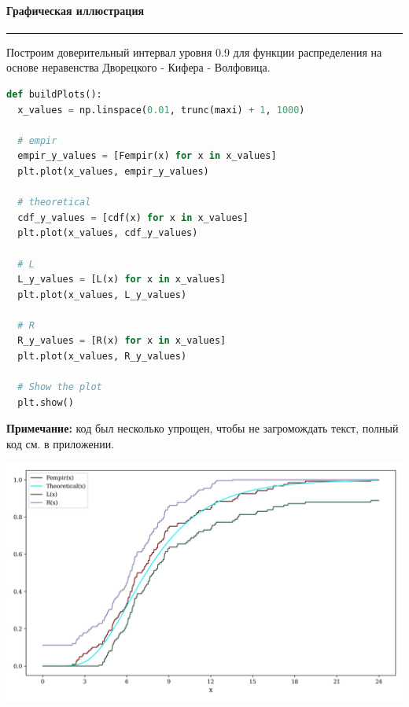 \documentclass[a4paper, 14pt]{extarticle}
\begin{document}
\paragraph{Графическая иллюстрация}\vspace{-20pt}\rule{\linewidth}{0.1mm}

Построим доверительный интервал уровня 0.9 для функции распределения на 
основе неравенства Дворецкого - Кифера - Волфовица.\\

\begin{center}
  \begin{lstlisting}[language=Python]
def buildPlots():
  x_values = np.linspace(0.01, trunc(maxi) + 1, 1000)

  # empir
  empir_y_values = [Fempir(x) for x in x_values]
  plt.plot(x_values, empir_y_values)

  # theoretical
  cdf_y_values = [cdf(x) for x in x_values]
  plt.plot(x_values, cdf_y_values)

  # L
  L_y_values = [L(x) for x in x_values]
  plt.plot(x_values, L_y_values)

  # R
  R_y_values = [R(x) for x in x_values]
  plt.plot(x_values, R_y_values)

  # Show the plot
  plt.show()
  \end{lstlisting}
\end{center}
\vspace{10pt}

{\footnotesize \textbf{Примечание:} код был несколько упрощен, чтобы не загромождать текст, 
полный код см. в приложении.}

\vspace{30pt}

\includegraphics[width=1\textwidth]{Dvoretzky-Kiefer-Wolfowitz}
\end{document}
